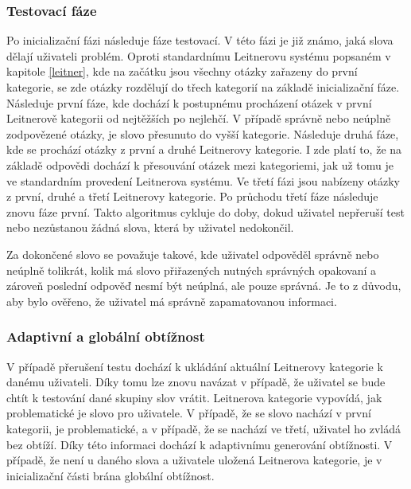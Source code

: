 \documentclass[a4paper,11pt,titlepage,fleqn]{article}
\begin{document}
        \subsubsection{Testovací fáze}
            Po inicializační fázi následuje fáze testovací. V této fázi je již známo, jaká slova dělají uživateli problém. Oproti standardnímu Leitnerovu systému popsaném v kapitole \ref{leitner}, kde na začátku jsou všechny otázky zařazeny do první kategorie, se zde otázky rozdělují do třech kategorií na základě inicializační fáze. Následuje první fáze, kde dochází k postupnému procházení otázek v první Leitnerově kategorii od nejtěžších po nejlehčí. V případě správně nebo neúplně zodpovězené otázky, je slovo přesunuto do vyšší kategorie. Následuje druhá fáze, kde se prochází otázky z první a druhé Leitnerovy kategorie. I zde platí to, že na základě odpovědi dochází k přesouvání otázek mezi kategoriemi, jak už tomu je ve standardním provedení Leitnerova systému. Ve třetí fázi jsou nabízeny otázky z první, druhé a třetí Leitnerovy kategorie. Po průchodu třetí fáze následuje znovu fáze první. Takto algoritmus cykluje do doby, dokud uživatel nepřeruší test nebo nezůstanou žádná slova, která by uživatel nedokončil. 

            Za dokončené slovo se považuje takové, kde uživatel odpověděl správně nebo neúplně tolikrát, kolik má slovo přiřazených nutných správných opakovaní a zároveň poslední odpověď nesmí být neúplná, ale pouze správná. Je to z důvodu, aby bylo ověřeno, že uživatel má správně zapamatovanou informaci.


        \subsubsection{Adaptivní a globální obtížnost}      
            V případě přerušení testu dochází k ukládání aktuální Leitnerovy kategorie k danému uživateli. Díky tomu lze znovu navázat v případě, že uživatel se bude chtít k testování dané skupiny slov vrátit. Leitnerova kategorie vypovídá, jak problematické je slovo pro uživatele. V případě, že se slovo nachází v první kategorii, je problematické, a v případě, že se nachází ve třetí, uživatel ho zvládá bez obtíží. Díky této informaci dochází k adaptivnímu generování obtížnosti. V případě, že není u daného slova a uživatele uložená Leitnerova kategorie, je v inicializační části brána globální obtížnost.
\end{document}

